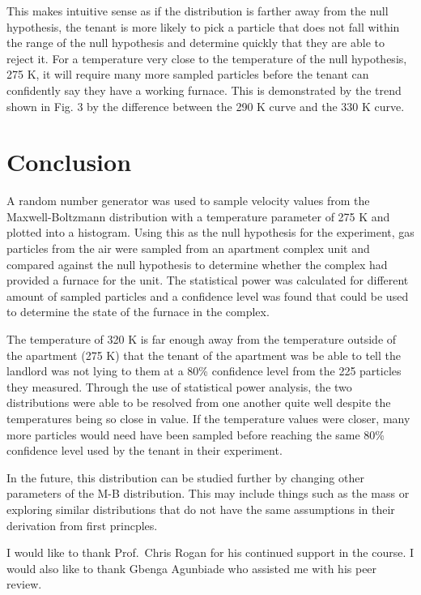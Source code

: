 \documentclass[%
 reprint,
 amsmath,amssymb,
 aps,
]{revtex4-2}
\begin{document}
This makes intuitive sense as if the distribution is farther away from the null hypothesis, the tenant is more likely to pick a particle that does not fall within the range of the null hypothesis and determine quickly that they are able to reject it. For a temperature very close to the temperature of the null hypothesis, 275 K, it will require many more sampled particles before the tenant can confidently say they have a working furnace. This is demonstrated by the trend shown in Fig. 3 by the difference between the 290 K curve and the 330 K curve. 

\section{Conclusion}

A random number generator was used to sample velocity values from the Maxwell-Boltzmann distribution with a temperature parameter of 275 K and plotted into a histogram. Using this as the null hypothesis for the experiment, gas particles from the air were sampled from an apartment complex unit and compared against the null hypothesis to determine whether the complex had provided a furnace for the unit. The statistical power was calculated for different amount of sampled particles and a confidence level was found that could be used to determine the state of the furnace in the complex.

The temperature of 320 K is far enough away from the temperature outside of the apartment (275 K) that the tenant of the apartment was be able to tell the landlord was not lying to them at a 80\% confidence level from the 225 particles they measured. Through the use of statistical power analysis, the two distributions were able to be resolved from one another quite well despite the temperatures being so close in value. If the temperature values were closer, many more particles would need have been sampled before reaching the same 80\% confidence level used by the tenant in their experiment. 

In the future, this distribution can be studied further by changing other parameters of the M-B distribution. This may include things such as the mass or exploring similar distributions that do not have the same assumptions in their derivation from first princples. 

\acknowledgements

I would like to thank Prof.\ Chris Rogan for his continued support in the course. I would also like to thank Gbenga Agunbiade who assisted me with his peer review.
\end{document}
